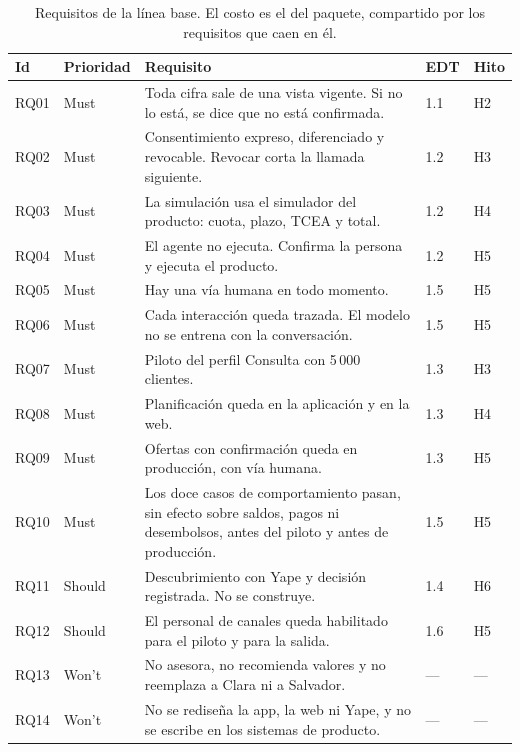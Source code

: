 \documentclass[11pt,a4paper]{article}
\begin{document}
\begin{table}[H]
\centering
\caption{Requisitos de la línea base. El costo es el del paquete, compartido por los requisitos que caen en él.}
\footnotesize
\setlength{\tabcolsep}{4pt}
\begin{tabularx}{\textwidth}{@{}l l X l l@{}}
\toprule
\textbf{Id} & \textbf{Prioridad} & \textbf{Requisito} & \textbf{EDT} & \textbf{Hito} \\
\midrule
RQ01 & Must & Toda cifra sale de una vista vigente. Si no lo está, se dice que no está confirmada. & 1.1 & H2 \\
RQ02 & Must & Consentimiento expreso, diferenciado y revocable. Revocar corta la llamada siguiente. & 1.2 & H3 \\
RQ03 & Must & La simulación usa el simulador del producto: cuota, plazo, TCEA y total. & 1.2 & H4 \\
RQ04 & Must & El agente no ejecuta. Confirma la persona y ejecuta el producto. & 1.2 & H5 \\
RQ05 & Must & Hay una vía humana en todo momento. & 1.5 & H5 \\
RQ06 & Must & Cada interacción queda trazada. El modelo no se entrena con la conversación. & 1.5 & H5 \\
RQ07 & Must & Piloto del perfil Consulta con 5\,000 clientes. & 1.3 & H3 \\
RQ08 & Must & Planificación queda en la aplicación y en la web. & 1.3 & H4 \\
RQ09 & Must & Ofertas con confirmación queda en producción, con vía humana. & 1.3 & H5 \\
RQ10 & Must & Los doce casos de comportamiento pasan, sin efecto sobre saldos, pagos ni desembolsos, antes del piloto y antes de producción. & 1.5 & H5 \\
\rowcolor{suave} RQ11 & Should & Descubrimiento con Yape y decisión registrada. No se construye. & 1.4 & H6 \\
\rowcolor{suave} RQ12 & Should & El personal de canales queda habilitado para el piloto y para la salida. & 1.6 & H5 \\
RQ13 & Won't & No asesora, no recomienda valores y no reemplaza a Clara ni a Salvador. & --- & --- \\
RQ14 & Won't & No se rediseña la app, la web ni Yape, y no se escribe en los sistemas de producto. & --- & --- \\
\bottomrule
\end{tabularx}
\end{table}
\end{document}
